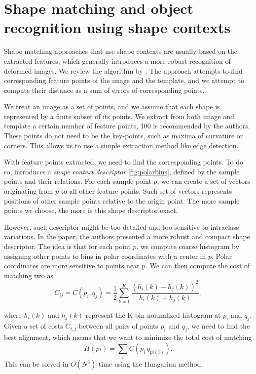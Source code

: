 \section{Shape matching and object recognition using shape contexts}
Shape matching approaches that use shape contexts are usually based on the extracted features, which generally introduces a more robust recognition of deformed images. We review the algorithm by \citet{simple}. The approach attempts to find corresponding feature points of the image and the template, and we attempt to compute their distance as a sum of errors of corresponding points. 

We treat an image as a set of points, and we assume that each shape is represented by a finite subset of its points. We extract from both image and template a certain number of feature points, 100 is recommended by the authors. These points do not need to be the key-points, such as maxima of curvature or corners. This allows us to use a simple extraction method like edge detection.

With feature points extracted, we need to find the corresponding points. To do so, \citet{simple} introduces a \emph{shape context descriptor} \ref{fig:polarbins}, defined by the sample points and their relations. For each sample point $p$, we can create a set of vectors originating from $p$ to all other feature points. Such set of vectors represents positions of other sample points relative to the origin point. The more sample points we choose, the more is this shape descriptor exact.

However, such descriptor might be too detailed and too sensitive to intraclass variations. In the paper, the authors presented a more robust and compact shape descriptor. The idea is that for each point $p$, we compute coarse histogram by assigning other points to bins in polar coordinates with a center in $p$. Polar coordinates are more sensitive to points near p. We can then compute the cost of matching two  as
\[ C_{ij} =  C(p_{i},q_{j}) = \frac{1}{2} \sum_{k=1}^{K} \frac{(h_{i}(k) - h_{j}(k))^2}{h_{i}(k) + h_{j}(k)}, \]

where $ h_{i}(k) $ and $ h_{j}(k) $ represent the K-bin normalized histogram at $p_{i}$ and $q_{j}$. Given a set of costs $C_{i,j}$ between all pairs of points $p_{i}$ and $q_{j}$, we need to find the best alignment, which means that we want to minimize the total cost of matching 
\[ H(pi) = \sum_{i} C(p_{i}\,q_{pi(i)}). \]
This can be solved in $O(N^3)$ time using the Hungarian method\cite{simple}. 

